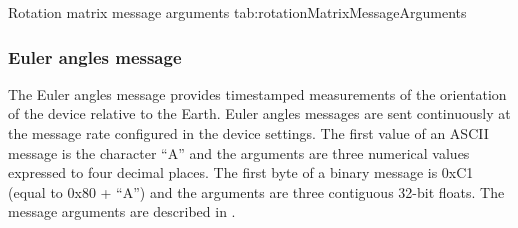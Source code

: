 \begingroup
    \def\tempArgumentA{Rotation matrix XX element}
    \def\tempArgumentB{Rotation matrix XY element}
    \def\tempArgumentC{Rotation matrix XZ element}
    \def\tempArgumentD{Rotation matrix YX element}
    \def\tempArgumentE{Rotation matrix YY element}
    \def\tempArgumentF{Rotation matrix YZ element}
    \def\tempArgumentG{Rotation matrix ZX element}
    \def\tempArgumentH{Rotation matrix ZY element}
    \def\tempArgumentI{Rotation matrix ZZ element}
    \dataMessageTable
    {Rotation matrix message arguments}
    {tab:rotationMatrixMessageArguments}
\endgroup

\begingroup
    \def\tempNameA{Rotation matrix XX element}
    \def\tempNameB{Rotation matrix XY element}
    \def\tempNameC{Rotation matrix XZ element}
    \def\tempNameD{Rotation matrix YX element}
    \def\tempNameE{Rotation matrix YY element}
    \def\tempNameF{Rotation matrix YZ element}
    \def\tempNameG{Rotation matrix ZX element}
    \def\tempNameH{Rotation matrix ZY element}
    \def\tempNameI{Rotation matrix ZZ element}
    \def\tempValueA{1}
    \def\tempValueB{0}
    \def\tempValueC{0}
    \def\tempValueD{0}
    \def\tempValueE{1}
    \def\tempValueF{0}
    \def\tempValueG{0}
    \def\tempValueH{0}
    \def\tempValueI{1}
    \def\tempAsciiFirst{R}
    \def\tempAsciiA{1.0000}
    \def\tempAsciiB{0.0000}
    \def\tempAsciiC{0.0000}
    \def\tempAsciiD{0.0000}
    \def\tempAsciiE{1.0000}
    \def\tempAsciiF{0.0000}
    \def\tempAsciiG{0.0000}
    \def\tempAsciiH{0.0000}
    \def\tempAsciiI{1.\linebreak0000} %
    \def\tempBinaryFirst{D2}
    \def\tempBinaryA{00 00 80 3F}
    \def\tempBinaryB{00 00 00 00}
    \def\tempBinaryC{00 00 00 00}
    \def\tempBinaryD{00 00 00 00}
    \def\tempBinaryE{00 00 80 3F}
    \def\tempBinaryF{00 00 00 00}
    \def\tempBinaryG{00 00 00 00}
    \def\tempBinaryH{00 00 00 00}
    \def\tempBinaryI{00 00 80 3F}
    \dataMessageExample
\endgroup

\subsubsection{Euler angles message}

The Euler angles message provides timestamped measurements of the orientation of the device relative to the Earth.  Euler angles messages are sent continuously at the message rate configured in the device settings.  The first value of an \ac{ASCII} message is the character \enquote{A} and the arguments are three numerical values expressed to four decimal places.  The first byte of a binary message is 0xC1 (equal to 0x80 + \enquote{A}) and the arguments are three contiguous 32-bit floats.  The message arguments are described in .


